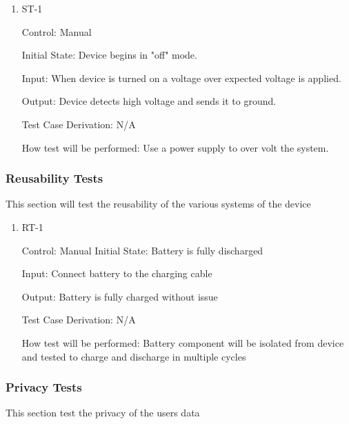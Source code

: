 \documentclass[12pt, titlepage]{article}
\begin{document}
\begin{enumerate}

\item{ST-1\\}

Control: Manual 

Initial State: Device begins in "off" mode.

Input: When device is turned on a voltage over expected voltage is applied.

Output: Device detects high voltage and sends it to ground.

Test Case Derivation: N/A

How test will be performed: Use a power supply to over volt the system. 

\end{enumerate}

\subsubsection{Reusability Tests}

This section will test the reusability of the various systems of the device

\begin{enumerate}

\item{RT-1\\}

Control: Manual
Initial State: Battery is fully discharged

Input: Connect battery to the charging cable 

Output: Battery is fully charged without issue

Test Case Derivation: N/A

How test will be performed: Battery component will be isolated from device and tested to charge and discharge in multiple cycles

\end{enumerate}

\subsubsection{Privacy Tests}

This section test the privacy of the users data 
\end{document}
